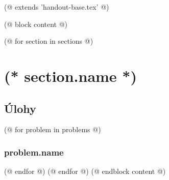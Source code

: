 (@ extends 'handout-base.tex' @)

(@ block content @)
    

    (@ for section in sections @)
        \section{(* section.name *)}
        
        \subsection{Úlohy}
        (@ for problem in problems @)
            \subsubsection{problem.name}
            
        (@ endfor @)
    (@ endfor @)
(@ endblock content @)
